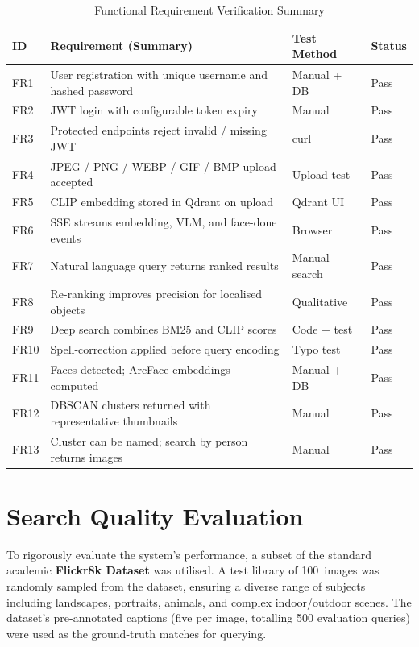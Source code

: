 \documentclass[12pt,a4paper,oneside]{report}
\begin{document}
\begin{table}[H]
\centering\small
\renewcommand{\arraystretch}{1.4}
\begin{tabular}{|p{1.0cm}|p{7.8cm}|p{2.5cm}|p{1.2cm}|}
\hline
\textbf{ID} & \textbf{Requirement (Summary)} & \textbf{Test Method} & \textbf{Status} \\
\hline
FR1  & User registration with unique username and hashed password & Manual + DB & Pass \\
\hline
FR2  & JWT login with configurable token expiry & Manual & Pass \\
\hline
FR3  & Protected endpoints reject invalid / missing JWT & curl & Pass \\
\hline
FR4  & JPEG / PNG / WEBP / GIF / BMP upload accepted & Upload test & Pass \\
\hline
FR5  & CLIP embedding stored in Qdrant on upload & Qdrant UI & Pass \\
\hline
FR6  & SSE streams embedding, VLM, and face-done events & Browser & Pass \\
\hline
FR7  & Natural language query returns ranked results & Manual search & Pass \\
\hline
FR8  & Re-ranking improves precision for localised objects & Qualitative & Pass \\
\hline
FR9  & Deep search combines BM25 and CLIP scores & Code + test & Pass \\
\hline
FR10 & Spell-correction applied before query encoding & Typo test & Pass \\
\hline
FR11 & Faces detected; ArcFace embeddings computed & Manual + DB & Pass \\
\hline
FR12 & DBSCAN clusters returned with representative thumbnails & Manual & Pass \\
\hline
FR13 & Cluster can be named; search by person returns images & Manual & Pass \\
\hline
\end{tabular}
\caption{Functional Requirement Verification Summary}
\label{tab:fr-verification}
\end{table}

\vspace{1cm}

\section{Search Quality Evaluation}

To rigorously evaluate the system's performance, a subset of the standard academic \textbf{Flickr8k Dataset} was utilised. A test library of 100~images was randomly sampled from the dataset, ensuring a diverse range of subjects including landscapes, portraits, animals, and complex indoor/outdoor scenes. The dataset's pre-annotated captions (five per image, totalling 500 evaluation queries) were used as the ground-truth matches for querying.
\end{document}
